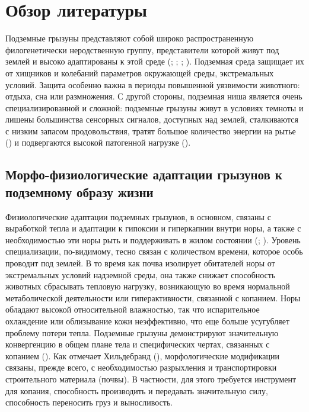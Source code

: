 \chapter{Обзор литературы} \label{lit_review}


Подземные грызуны представляют собой широко распространенную филогенетически неродственную группу, представители которой живут под землей и высоко адаптированы к этой среде (\cite{Nevo1990}; \cite{Nevo1999}; \cite{Lacey2000}; \cite{Begall2007}). Подземная среда  защищает их от хищников и колебаний параметров окружающей среды, экстремальных условий. Защита особенно важна в периоды повышенной уязвимости животного: отдыха, сна или размножения. С другой стороны, подземная ниша является очень специализированной и сложной: подземные грызуны живут в условиях темноты и лишены большинства сенсорных сигналов, доступных над землей, сталкиваются с низким запасом продовольствия, тратят большое количество энергии на рытье (\cite{Begall2007}) и подвергаются высокой патогенной нагрузке (\cite{Nevo1999}).


\section{Морфо-физиологические адаптации грызунов к подземному образу жизни}

Физиологические адаптации подземных грызунов, в основном, связаны с выработкой тепла и адаптации к гипоксии и гиперкапнии внутри норы, а также с необходимостью эти норы рыть и поддерживать в жилом состоянии (\cite{Nevo1999}; \cite{McNab1966}). Уровень специализации, по-видимому, тесно связан с количеством времени, которое особь проводит под землей. В то время как почва изолирует обитателей норы от экстремальных условий надземной среды, она также снижает способность животных сбрасывать тепловую нагрузку, возникающую во время нормальной метаболической деятельности или гиперактивности, связанной с копанием. Норы обладают высокой относительной влажностью, так что испарительное охлаждение или облизывание кожи неэффективно, что еще больше усугубляет проблему потери тепла. Подземные грызуны демонстрируют значительную конвергенцию в общем плане тела и специфических чертах, связанных с копанием (\cite{Nevo1979}). Как отмечает Хильдебранд (\cite{Hildebrand1985}), морфологические модификации связаны, прежде всего, с необходимостью разрыхления и транспортировки строительного материала (почвы). В частности, для этого требуется инструмент для копания, способность производить и передавать значительную силу, способность переносить груз и выносливость. 

